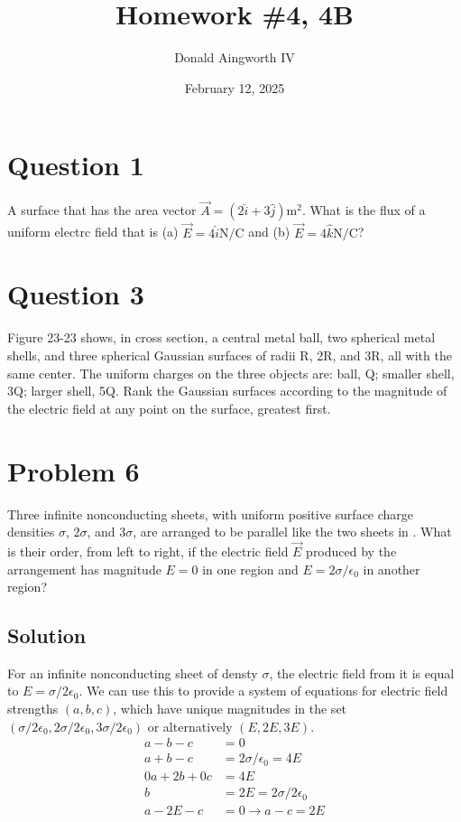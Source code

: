 \documentclass[12pt]{article}
\title{Homework \#4, 4B}
\author{Donald Aingworth IV}
\date{February 12, 2025}
\begin{document}

\maketitle

\section{Question 1}
A surface that has the area vector $\vec{A} = \left(2\hat{i} + 3\hat{j}\right) \unit{\meter^2}$. What is the flux of a uniform electrc field that is (a) $\vec{E} = 4\hat{i} \unit{\newton/\coulomb}$ and (b) $\vec{E} = 4\hat{k} \unit{\newton/\coulomb}$?

\section{Question 3}
Figure 23-23 shows, in cross section, a central metal ball, two spherical metal shells, and three spherical Gaussian surfaces of radii R, 2R, and 3R, all with the same center. The uniform charges on the three objects are: ball, Q; smaller shell, 3Q; larger shell, 5Q. Rank the Gaussian surfaces according to the magnitude of the electric field at any point on the surface, greatest first.

\pagebreak
\section{Problem 6}
Three infinite nonconducting sheets, with uniform positive surface charge densities $\sigma$, $2\sigma$, and $3\sigma$, are arranged to be parallel like the two sheets in . What is their order, from left to right, if the electric field $\vec{E}$ produced by the arrangement has magnitude $E = 0$ in one region and $E = 2\sigma/\epsilon_0$ in another region?

\subsection*{Solution}
For an infinite nonconducting sheet of densty $\sigma$, the electric field from it is equal to $E = \sigma/2\epsilon_0$. We can use this to provide a system of equations for electric field strengths $(a, b, c)$, which have unique magnitudes in the set $(\sigma/2\epsilon_0, 2\sigma/2\epsilon_0, 3\sigma/2\epsilon_0)$ or alternatively $(E, 2E, 3E)$. 
\begin{align*}
    a - b - c &= 0\\
    a + b - c &= 2\sigma/\epsilon_0 = 4E\\
    0a + 2b + 0c &= 4E\\
    b &= 2E = 2\sigma/2\epsilon_0\\
    a - 2E - c &= 0 \rightarrow a - c = 2E
\end{align*}
\end{document}

